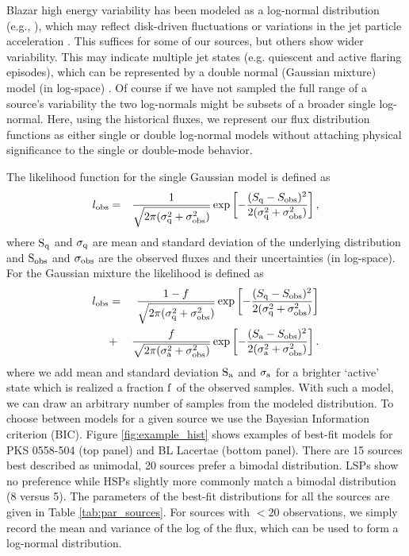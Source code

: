 	Blazar high energy variability has been modeled as a log-normal distribution 
(e.g., \citealp{romoli_flux_2018,shah_log-normal_2018}), which may reflect disk-driven fluctuations \citep{lyubarskii_flicker_1997}
or variations in the jet particle acceleration \citep{sinha_flux_2018}. This suffices for some of our sources,
but others show wider variability. This may indicate multiple jet states (e.g. quiescent and active
flaring episodes), which can be represented by a double normal (Gaussian mixture) model (in log-space)
\citep{liodakis_bimodal_2017}. Of course if we have not sampled the full range of a source's variability the 
two log-normals might be subsets of a broader single log-normal. Here, using the historical fluxes,
we represent our flux distribution functions as either single or double log-normal models
without attaching physical significance to the single or double-mode behavior.

The likelihood function for the single Gaussian model is defined as
 \begin{eqnarray}
l_{\rm obs}&=&\frac{1}{\sqrt{2\pi(\sigma_{\rm q}^2+\sigma_{\rm obs}^2)}}
\exp\left[-\frac{(S_{\rm q}-S_{\rm obs})^2}{2(\sigma_{\rm q}^2+\sigma_{\rm obs}^2)}\right],
\end{eqnarray}
where $\rm S_{\rm q}$ and $\rm \sigma_{\rm q}$ are mean and standard deviation of the underlying distribution 
and $\rm S_{\rm obs}$ and $\rm \sigma_{\rm obs}$ are the observed fluxes and their uncertainties (in log-space). For the 
Gaussian mixture the likelihood is defined as
\begin{eqnarray}
l_{\rm obs}&=&\frac{1-f}{\sqrt{2\pi(\sigma_{\rm q}^2+\sigma_{\rm obs}^2)}}\exp\left[-\frac{(S_{\rm q}-S_{\rm obs})^2}{2(\sigma_{\rm q}^2+\sigma_{\rm obs}^2)}\right]\nonumber\\
&+&\frac{f}{\sqrt{2\pi(\sigma_{\rm a}^2+\sigma_{\rm obs}^2)}}\exp\left[-\frac{(S_{\rm a}-S_{\rm obs})^2}{2(\sigma_{\rm a}^2+\sigma_{\rm obs}^2)}\right].
\end{eqnarray}
where we add mean and standard deviation $\rm S_{\rm a}$ and $\rm \sigma_{\rm a}$ for a brighter `active' state
which is realized a fraction $\rm f$ of the observed samples. With such a model, we can draw an arbitrary number
of samples from the modeled distribution. To choose between models for a given source we use the Bayesian 
Information criterion (BIC).  Figure \ref{fig:example_hist} shows examples of best-fit models for 
PKS 0558-504 (top panel) and BL Lacertae (bottom panel). There are 15 sources best described as unimodal,
20 sources prefer a bimodal distribution. LSPs show no preference while HSPs slightly more
commonly match a bimodal distribution (8 versus 5).  The parameters of the best-fit distributions for 
all the sources are given in Table \ref{tab:par_sources}. For sources with $<20$ observations,
we simply record the mean and variance of the log of the flux, which can be used to form a log-normal distribution.


